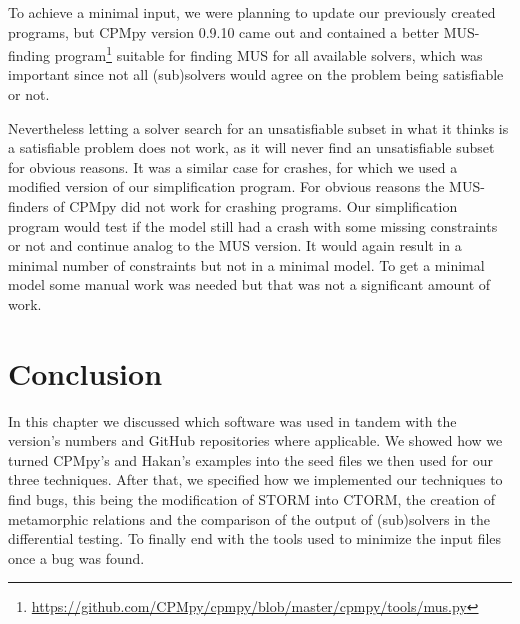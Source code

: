 To achieve a minimal input, we were planning to update our previously created programs, but CPMpy version 0.9.10 came out and contained a better MUS-finding program\footnote{\url{https://github.com/CPMpy/cpmpy/blob/master/cpmpy/tools/mus.py}} suitable for finding MUS for all available solvers, which was important since not all (sub)solvers would agree on the problem being satisfiable or not.


Nevertheless letting a solver search for an unsatisfiable subset in what it thinks is a satisfiable problem does not work, as it will never find an unsatisfiable subset for obvious reasons.
It was a similar case for crashes, for which we used a modified version of our simplification program. For obvious reasons the MUS-finders of CPMpy did not work for crashing programs. Our simplification program would test if the model still had a crash with some missing constraints or not and continue analog to the MUS version. It would again result in a minimal number of constraints but not in a minimal model. To get a minimal model some manual work was needed but that was not a significant amount of work. 



\section{Conclusion}
\label{impl:conclusion}
In this chapter we discussed which software was used in tandem with the version’s numbers and GitHub repositories where applicable. We showed how we turned CPMpy’s and Hakan’s examples into the seed files we then used for our three techniques. After that, we specified how we implemented our techniques to find bugs, this being the modification of STORM into CTORM, the creation of metamorphic relations and the comparison of the output of (sub)solvers in the differential testing. To finally end with the tools used to minimize the input files once a bug was found.


